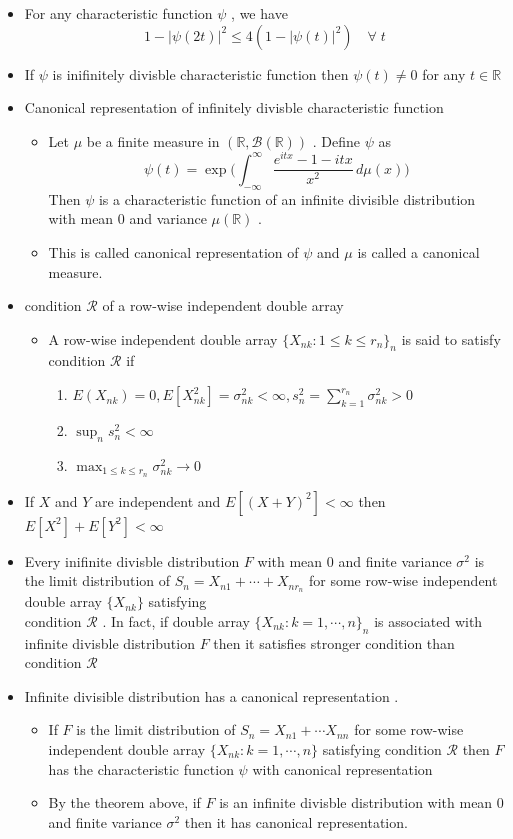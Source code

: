 \documentclass[12pt, A4]{article}
\newcommand{\R}{\mathbb{R}}
\newcommand{\B}{\mathcal{B}}
\begin{document}
\begin{itemize}
\begin{itemize}
	\end{itemize}
	\item For any characteristic function $\psi$ , we have $$1-|\psi(2t)|^2\leq 4(1-|\psi(t)|^2) \quad \forall \; t$$
	\item If $\psi$ is inifinitely divisble characteristic function then $\psi(t)\neq 0$ for any $t\in \R$
	\item Canonical representation of infinitely divisble characteristic function
	\begin{itemize}
		\item Let $\mu$ be a finite measure in $(\R, \B(\R))$ . Define $\psi$ as $$\psi(t) = \exp \bigg( \int_{-\infty}^\infty \frac{e^{itx}-1-itx}{x^2}\, d\mu(x) \bigg) $$ Then $\psi$ is a characteristic function of an infinite divisible distribution with mean $0$ and variance $\mu(\R)$ .
		\item This is called canonical representation of $\psi$ and $\mu$ is called a canonical measure.
	\end{itemize}
	\item condition $\mathcal{R}$ of a row-wise independent double array
	\begin{itemize}
		\item A row-wise independent double array $\{X_{nk} : 1\leq k\leq r_n\}_n$ is said to satisfy condition $\mathcal{R}$ if 
		\begin{enumerate}
			\item $E(X_{nk})=0 , E[X_{nk}^2]=\sigma_{nk}^2<\infty , s_n^2 = \sum_{k=1}^{r_n} \sigma_{nk}^2 >0$
			\item $\sup_n s_n^2 <\infty$
			\item $\max_{1\leq k\leq r_n} \sigma_{nk}^2 \rightarrow 0$ 
		\end{enumerate}
	\end{itemize}
	\item If $X$ and $Y$ are independent and $E[(X+Y)^2]<\infty$ then $E[X^2]+E[Y^2]<\infty$
	\item Every inifinite divisble distribution $F$ with mean $0$ and finite variance $\sigma^2$ is the limit distribution of $S_n = X_{n1}+\cdots + X_{nr_n}$ for some row-wise independent double array $\{X_{nk}\}$ satisfying \\condition $\mathcal{R}$ . In fact, if double array $\{X_{nk} : k=1, \cdots, n\}_n$ is associated with infinite divisble distribution $F$ then it satisfies stronger condition than condition $\mathcal{R}$
	\item Infinite divisible distribution has a canonical representation .
	\begin{itemize}
		\item If $F$ is the limit distribution of $S_n = X_{n1}+\cdots X_{nn}$ for some row-wise independent double array $\{X_{nk} : k=1, \cdots, n\}$ satisfying condition $\mathcal{R}$ then $F$ has the characteristic function $\psi$ with canonical representation 
		\item By the theorem above, if $F$ is an infinite divisble distribution with mean $0$ and finite variance $\sigma^2$ then it has canonical representation.
	\end{itemize} 
\end{itemize}
\end{document}
